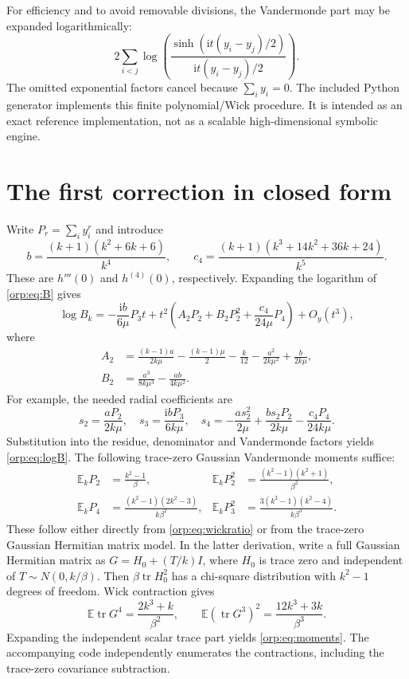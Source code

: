 \documentclass[11pt]{article}
\theoremstyle{remark}\newtheorem{remark}[theorem]{Remark}
\newcommand{\E}{\mathbb E}
\newcommand{\ii}{\mathrm i}
\newcommand{\tr}{\operatorname{tr}}
\begin{document}
For efficiency and to avoid removable divisions, the Vandermonde part may be expanded logarithmically:
\begin{equation}\label{orp:eq:logvand}
 2\sum_{i<j}\log\left(\frac{\sinh(\ii t(y_i-y_j)/2)}{\ii t(y_i-y_j)/2}\right).
\end{equation}
The omitted exponential factors cancel because $\sum_i y_i=0$. The included Python generator implements this finite polynomial/Wick procedure. It is intended as an exact reference implementation, not as a scalable high-dimensional symbolic engine.

\section{The first correction in closed form}\label{orp:sec:first}
Write $P_r=\sum_i y_i^r$ and introduce
\[
 b=\frac{(k+1)(k^2+6k+6)}{k^4},\qquad
 c_4=\frac{(k+1)(k^3+14k^2+36k+24)}{k^5}.
\]
These are $h'''(0)$ and $h^{(4)}(0)$, respectively. Expanding the logarithm of \eqref{orp:eq:B} gives
\begin{equation}\label{orp:eq:logB}
 \log B_k=-\frac{\ii b}{6\mu}P_3t
 +t^2\left(A_2P_2+B_2P_2^2+\frac{c_4}{24\mu}P_4\right)+O_y(t^3),
\end{equation}
where
\begin{align}
 A_2&=\frac{(k-1)a}{2k\mu}-\frac{(k-1)\mu}{2}-\frac{k}{12}
      -\frac{a^2}{2k\mu^2}+\frac{b}{2k\mu},\label{orp:eq:A2}\\
 B_2&=\frac{a^3}{8k\mu^3}-\frac{ab}{4k\mu^2}.\label{orp:eq:B2}
\end{align}
For example, the needed radial coefficients are
\[
 s_2=\frac{aP_2}{2k\mu},\quad
 s_3=\frac{\ii bP_3}{6k\mu},\quad
 s_4=-\frac{as_2^2}{2\mu}+\frac{bs_2P_2}{2k\mu}-\frac{c_4P_4}{24k\mu}.
\]
Substitution into the residue, denominator and Vandermonde factors yields \eqref{orp:eq:logB}. The following trace-zero Gaussian Vandermonde moments suffice:
\begin{align}
 \E_kP_2&=\frac{k^2-1}{\beta}, &
 \E_kP_2^2&=\frac{(k^2-1)(k^2+1)}{\beta^2},\nonumber\\
 \E_kP_4&=\frac{(k^2-1)(2k^2-3)}{k\beta^2}, &
 \E_kP_3^2&=\frac{3(k^2-1)(k^2-4)}{k\beta^3}.\label{orp:eq:moments}
\end{align}
These follow either directly from \eqref{orp:eq:wickratio} or from the trace-zero Gaussian Hermitian matrix model. In the latter derivation, write a full Gaussian Hermitian matrix as $G=H_0+(T/k)I$, where $H_0$ is trace zero and independent of $T\sim N(0,k/\beta)$. Then $\beta\tr H_0^2$ has a chi-square distribution with $k^2-1$ degrees of freedom. Wick contraction gives
\[
 \E\tr G^4=\frac{2k^3+k}{\beta^2},\qquad
 \E(\tr G^3)^2=\frac{12k^3+3k}{\beta^3}.
\]
Expanding the independent scalar trace part yields \eqref{orp:eq:moments}. The accompanying code independently enumerates the contractions, including the trace-zero covariance subtraction.
\end{document}
